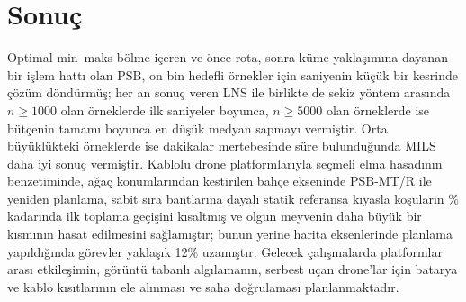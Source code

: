 \section{Sonuç}\label{sec:conclusion}

Optimal min--maks bölme içeren ve önce rota, sonra küme yaklaşımına dayanan bir işlem hattı olan PSB, on bin
hedefli örnekler için saniyenin küçük bir kesrinde çözüm döndürmüş; her an sonuç veren
LNS ile birlikte de sekiz yöntem arasında $n\ge 1000$ olan örneklerde ilk saniyeler boyunca,
$n\ge 5000$ olan örneklerde ise bütçenin tamamı boyunca en düşük medyan sapmayı vermiştir.
Orta büyüklükteki örneklerde ise dakikalar mertebesinde süre bulunduğunda MILS daha iyi sonuç vermiştir. Kablolu drone
platformlarıyla seçmeli elma hasadının benzetiminde, ağaç konumlarından kestirilen bahçe
ekseninde PSB-MT/R ile yeniden planlama, sabit sıra bantlarına dayalı statik referansa kıyasla
koşuların \HgFirstRowblockWin\% kadarında ilk toplama geçişini kısaltmış ve olgun meyvenin
daha büyük bir kısmının hasat edilmesini sağlamıştır; bunun yerine harita eksenlerinde planlama
yapıldığında görevler yaklaşık 12\% uzamıştır. Gelecek çalışmalarda platformlar arası etkileşimin,
görüntü tabanlı algılamanın, serbest uçan drone'lar için batarya ve kablo kısıtlarının ele alınması ve
saha doğrulaması planlanmaktadır.
